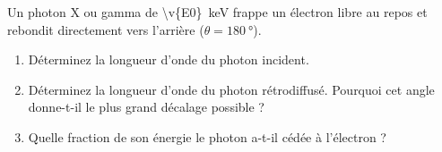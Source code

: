 Un photon X ou gamma de \qty{\v{E0}}{keV} frappe un électron libre au repos et rebondit directement vers l'arrière ($\theta = \qty{180}{\degree}$).

\begin{enumerate}[label=\alph*)]
    \item Déterminez la longueur d'onde du photon incident.
    \item Déterminez la longueur d'onde du photon rétrodiffusé. Pourquoi cet angle donne-t-il le plus grand décalage possible ?
    \item Quelle fraction de son énergie le photon a-t-il cédée à l'électron ?
\end{enumerate}
